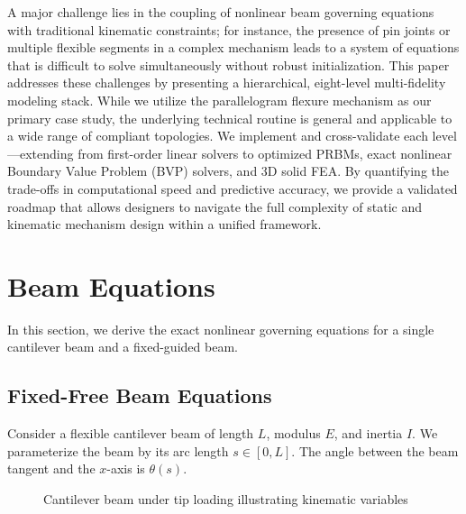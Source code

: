 \documentclass[colorlinks,upint,subscriptcorrection,varvw,hyphenate,balance]{asmeconf} %
\begin{document}
A major challenge lies in the coupling of nonlinear beam governing equations with traditional kinematic constraints; for instance, the presence of pin joints or multiple flexible segments in a complex mechanism leads to a system of equations that is difficult to solve simultaneously without robust initialization. This paper addresses these challenges by presenting a hierarchical, eight-level multi-fidelity modeling stack. While we utilize the parallelogram flexure mechanism as our primary case study, the underlying technical routine is general and applicable to a wide range of compliant topologies. We implement and cross-validate each level---extending from first-order linear solvers to optimized PRBMs, exact nonlinear Boundary Value Problem (BVP) solvers, and 3D solid FEA. By quantifying the trade-offs in computational speed and predictive accuracy, we provide a validated roadmap that allows designers to navigate the full complexity of static and kinematic mechanism design within a unified framework.


\section{Beam Equations}
\label{sec:beam_equations}
In this section, we derive the exact nonlinear governing equations for a single cantilever beam and a fixed-guided beam.

\subsection{Fixed-Free Beam Equations}
Consider a flexible cantilever beam of length $L$, modulus $E$, and inertia $I$. We parameterize the beam by its arc length $s \in [0, L]$. The angle between the beam tangent and the $x$-axis is $\theta(s)$.

\begin{figure}[ht]
\centering
{}
\caption{Cantilever beam under tip loading illustrating kinematic variables}
\label{fig:cantilever}
\end{figure}
\end{document}
